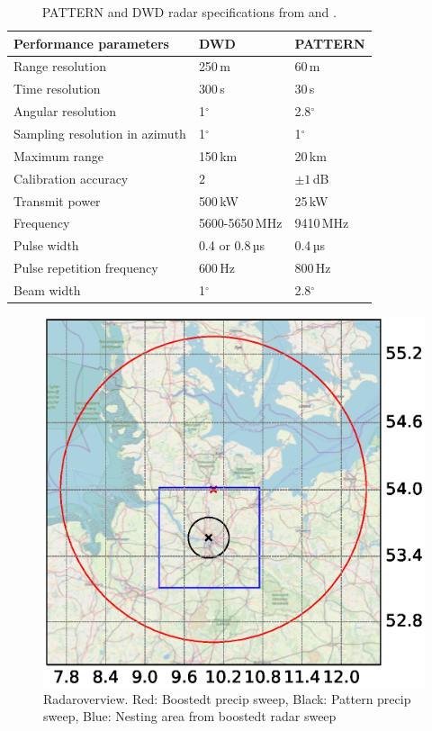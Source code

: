 \documentclass[11pt,twoside,a4paper,fleqn,x11names]{report}
\renewcommand{\deg}{\ensuremath{^{\circ}}}  %
\numberwithin{equation}{chapter}
\numberwithin{figure}{chapter}
\numberwithin{table}{chapter}
\begin{document}
\begin{table}[!htbp]
	\centering
	\caption[]{PATTERN and DWD radar specifications from \citep{Lengfeld2014} and \citep{Frech2013}.}
	\label{tab:radarspec}
	\begin{tabular}{|l|l|l|}
		\hline
		Performance parameters &DWD & PATTERN\\\hline
		Range resolution & 250\,m & 60\,m\\
		Time resolution & 300\,s & 30\,s\\
		Angular resolution & 1\deg & 2.8\deg\\
		Sampling resolution in azimuth & 1\deg & 1\deg\\
		Maximum range& 150\,km & 20\,km\\
		Calibration accuracy& $2$ & $\pm1$\,dB\\
		Transmit power & 500\,kW & 25\,kW\\
		Frequency & 5600-5650\,MHz & 9410\,MHz\\
		Pulse width & 0.4 or 0.8\,µs & 0.4\,µs \\
		Pulse repetition frequency & 600\,Hz & 800\,Hz  \\
		Beam width & 1\deg & 2.8\deg \\\hline
	\end{tabular}
\end{table}
\begin{figure}[!htbp]
	\centering
	\includegraphics[width=\textwidth,trim={20mm 0 20mm 0}, clip]{radarOverview.eps}
	\caption{Radaroverview. Red: Boostedt precip sweep, Black: Pattern precip sweep, Blue: Nesting area from boostedt radar sweep}
	\label{fig:radarOverview}
\end{figure}
\end{document}
